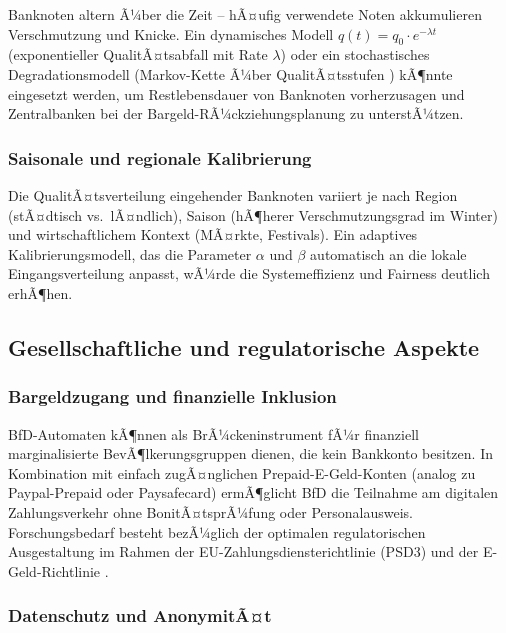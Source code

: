 ﻿\documentclass[a4paper,12pt]{article}
\theoremstyle{definition}
\begin{document}
Banknoten altern Ã¼ber die Zeit -- hÃ¤ufig verwendete Noten akkumulieren
Verschmutzung und Knicke.  Ein dynamisches Modell
$q(t) = q_0 \cdot e^{-\lambda t}$ (exponentieller QualitÃ¤tsabfall mit Rate $\lambda$)
oder ein stochastisches Degradationsmodell (Markov-Kette Ã¼ber QualitÃ¤tsstufen \cite{ross2014introduction})
kÃ¶nnte eingesetzt werden, um Restlebensdauer von Banknoten vorherzusagen
und Zentralbanken bei der Bargeld-RÃ¼ckziehungsplanung zu unterstÃ¼tzen.

\subsubsection{Saisonale und regionale Kalibrierung}

Die QualitÃ¤tsverteilung eingehender Banknoten variiert je nach Region
(stÃ¤dtisch vs.\ lÃ¤ndlich), Saison (hÃ¶herer Verschmutzungsgrad im Winter)
und wirtschaftlichem Kontext (MÃ¤rkte, Festivals).
Ein adaptives Kalibrierungsmodell, das die Parameter $\alpha$ und $\beta$
automatisch an die lokale Eingangsverteilung anpasst, wÃ¼rde die Systemeffizienz
und Fairness deutlich erhÃ¶hen.

\subsection{Gesellschaftliche und regulatorische Aspekte}

\subsubsection{Bargeldzugang und finanzielle Inklusion}

BfD-Automaten kÃ¶nnen als BrÃ¼ckeninstrument fÃ¼r finanziell marginalisierte
BevÃ¶lkerungsgruppen dienen, die kein Bankkonto besitzen.
In Kombination mit einfach zugÃ¤nglichen Prepaid-E-Geld-Konten
(analog zu Paypal-Prepaid oder Paysafecard) ermÃ¶glicht BfD die Teilnahme
am digitalen Zahlungsverkehr ohne BonitÃ¤tsprÃ¼fung oder Personalausweis.
Forschungsbedarf besteht bezÃ¼glich der optimalen regulatorischen Ausgestaltung
im Rahmen der EU-Zahlungsdiensterichtlinie (PSD3) und der E-Geld-Richtlinie \cite{eu2009emoney}.

\subsubsection{Datenschutz und AnonymitÃ¤t}
\end{document}
